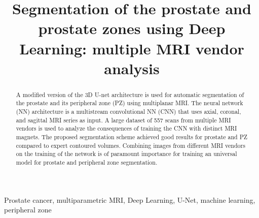 \documentclass[smallextended]{svjour3}
\begin{document}
\title{ Segmentation of the prostate and prostate zones using Deep Learning: multiple MRI vendor analysis }

\begin{abstract}
A modified version of the 3D U-net architecture is used for automatic segmentation of the prostate and its peripheral zone (PZ) using multiplanar MRI. The neural network (NN) architecture is a multistream convolutional NN (CNN) that uses axial, coronal, and sagittal MRI series as input.  A large dataset of 557 scans from multiple MRI vendors is used to analyze the consequences of training the CNN with distinct MRI magnets.  The proposed segmentation scheme achieved good results for prostate and PZ compared to expert contoured volumes. Combining images from different MRI vendors on the training of the network is of paramount importance for training an universal model for prostate and peripheral zone segmentation. 
\end{abstract}

\begin{keywords}
Prostate cancer, multiparametric MRI, Deep Learning, U-Net, 
machine learning, peripheral zone
\end{keywords}








%
%
\end{document}
